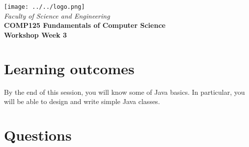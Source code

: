 \documentclass{exam}
\begin{document}

%
\vspace{0.2in}
\begin{center}
        {\large  %
\texttt{[image: ../../logo.png]}\\
\medskip
        {\it  Faculty of Science and Engineering\\}
        \vspace{0.2in}
         {\bf COMP125 Fundamentals of Computer Science\\
        Workshop Week 3\\}}
\end{center}
\vspace{0.3in}
%

\renewcommand{\labelenumi}{\alph{enumi}.}
 
\section*{Learning outcomes}

By the end of this session, you will know some of Java basics.
In particular, you will be able to design and write simple Java classes.

\section*{Questions}
\end{document}
